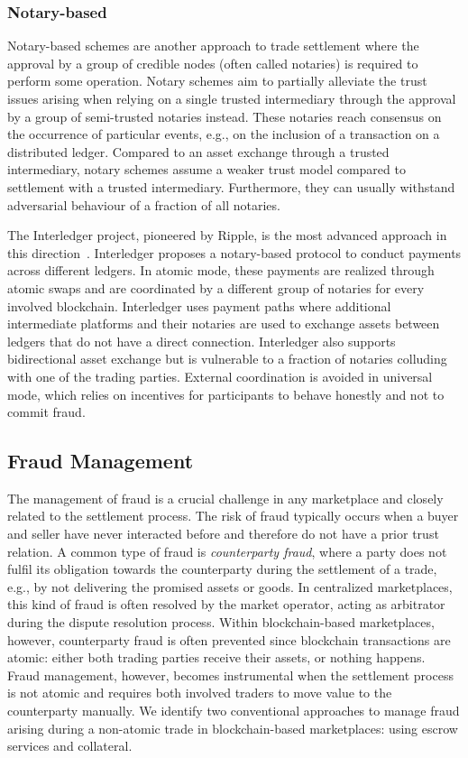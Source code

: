 \subsubsection{Notary-based}
Notary-based schemes are another approach to trade settlement where the approval by a group of credible nodes (often called notaries) is required to perform some operation.
Notary schemes aim to partially alleviate the trust issues arising when relying on a single trusted intermediary through the approval by a group of semi-trusted notaries instead.
These notaries reach consensus on the occurrence of particular events, e.g., on the inclusion of a transaction on a distributed ledger.
Compared to an asset exchange through a trusted intermediary, notary schemes assume a weaker trust model compared to settlement with a trusted intermediary. Furthermore, they can usually withstand adversarial behaviour of a fraction of all notaries.

The Interledger project, pioneered by Ripple, is the most advanced approach in this direction~\cite{thomas2015protocol}.
Interledger proposes a notary-based protocol to conduct payments across different ledgers.
In atomic mode, these payments are realized through atomic swaps and are coordinated by a different group of notaries for every involved blockchain.
Interledger uses payment paths where additional intermediate platforms and their notaries are used to exchange assets between ledgers that do not have a direct connection.
Interledger also supports bidirectional asset exchange but is vulnerable to a fraction of notaries colluding with one of the trading parties.
External coordination is avoided in universal mode, which relies on incentives for participants to behave honestly and not to commit fraud.

\subsection{Fraud Management}
The management of fraud is a crucial challenge in any marketplace and closely related to the settlement process.
The risk of fraud typically occurs when a buyer and seller have never interacted before and therefore do not have a prior trust relation.
A common type of fraud is \emph{counterparty fraud}, where a party does not fulfil its obligation towards the counterparty during the settlement of a trade, e.g., by not delivering the promised assets or goods.
In centralized marketplaces, this kind of fraud is often resolved by the market operator, acting as arbitrator during the dispute resolution process.
Within blockchain-based marketplaces, however, counterparty fraud is often prevented since blockchain transactions are atomic: either both trading parties receive their assets, or nothing happens.
Fraud management, however, becomes instrumental when the settlement process is not atomic and requires both involved traders to move value to the counterparty manually. %
We identify two conventional approaches to manage fraud arising during a non-atomic trade in blockchain-based marketplaces: using escrow services and collateral.

